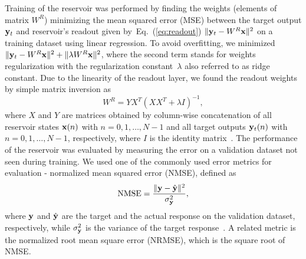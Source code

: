 \documentclass{WileyMSP-template}
\begin{document}
Training of the reservoir was performed by finding the weights (elements of matrix $W^R$) minimizing the mean squared error (MSE) between the target output $\vb{y}_{t}$ and reservoir's readout given by~Eq.~(\ref{eq:readout}) $\lVert \vb{y}_{t}-W^R\vb{x}\rVert^2$ on a training dataset using linear regression.
To avoid overfitting, we minimized $\lVert \vb{y}_t-W^R\vb{x}\rVert^2+\lVert\lambda W^R\vb{x}\rVert^2$, where the second term stands for weights regularization with the regularization constant~$\lambda$ also referred to as ridge constant.
Due to the linearity of the readout layer, we found the readout weights by simple matrix inversion as
\begin{equation}
  W^R=YX^T\left(XX^T+\lambda I\right)^{-1},
\end{equation}
where $X$ and $Y$ are matrices obtained by column-wise concatenation of all reservoir states $\vb{x}(n)$ with $n=0,1,\ldots,N-1$ and all target outputs $\vb{y}_t(n)$ with $n=0,1,\ldots,N-1$, respectively, where $I$ is the identity matrix~\cite{ref:trouvain2020}.
The performance of the reservoir was evaluated by measuring the error on a validation dataset not seen during training.
We used one of the commonly used error metrics for evaluation - normalized mean squared error (NMSE), defined as
\begin{equation}
  \mathrm{NMSE}=\frac{\lVert\vb{y}-\hat{\vb{y}}\rVert^2}{\sigma^2_{\vb{y}}},
\label{eq:nmse}
\end{equation}
where $\vb{y}$ and $\hat{\vb{y}}$ are the target and the actual response on the validation dataset, respectively, while $\sigma^2_{\vb{y}}$ is the variance of the target response~\cite{ref:botchkarev2019}.
A related metric is the normalized root mean square error (NRMSE), which is the square root of NMSE.
\end{document}
